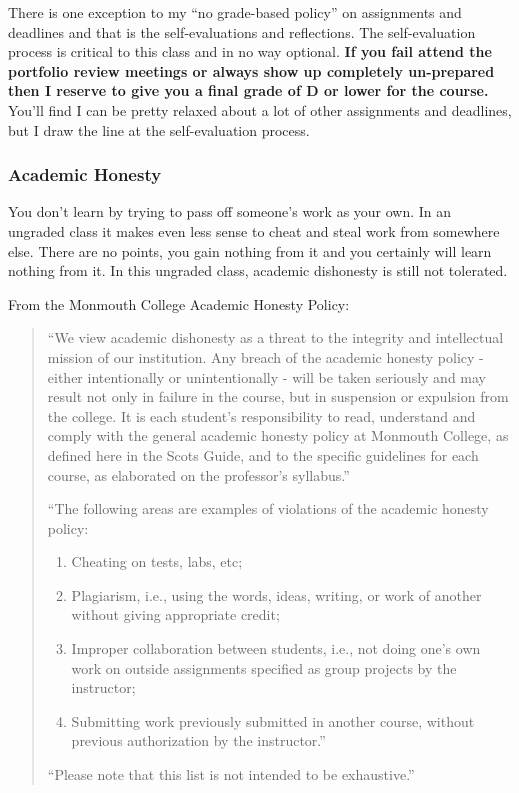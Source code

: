\documentclass[10pt]{article}
\begin{document}
There is one exception to my ``no grade-based policy'' on assignments and deadlines and that is the
self-evaluations and reflections. The self-evaluation process is critical to this class and in no way
optional. \textbf{If you fail attend the portfolio review meetings or always show up completely un-prepared
then I reserve to give you a final grade of D or lower for the course.} You'll find I can be pretty relaxed
about a lot of other assignments and deadlines, but I draw the line at the self-evaluation process.


\subsubsection*{Academic Honesty}

You don't learn by trying to pass off someone's work as your own. In an ungraded class it makes even less sense to cheat and steal work from somewhere else.  There are no points, you gain nothing from it and you certainly will learn nothing from it. In this ungraded class, academic dishonesty is still not tolerated.

From the Monmouth College Academic Honesty Policy:
\begin{quote}
  ``We view academic dishonesty as a threat to the integrity and intellectual mission of our institution. Any breach of the academic honesty policy - either intentionally or unintentionally - will be taken seriously and may result not only in failure in the course, but in suspension or expulsion from the college. It is each student’s responsibility to read, understand and comply with the general academic honesty policy at Monmouth College, as defined here in the Scots Guide, and to the specific guidelines for each course, as elaborated on the professor’s syllabus.''

  ``The following areas are examples of violations of the academic honesty policy:
  \begin{enumerate}
  \item Cheating on tests, labs, etc;
  \item Plagiarism, i.e., using the words, ideas, writing, or work of another without giving appropriate credit;
  \item Improper collaboration between students, i.e., not doing one’s own work on outside assignments specified as group projects by the instructor;
  \item Submitting work previously submitted in another course, without previous authorization by the instructor.''
  \end{enumerate}

  ``Please note that this list is not intended to be exhaustive.''
\end{quote}
\end{document}
